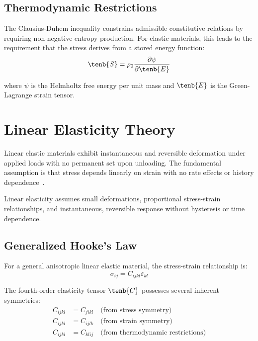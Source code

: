 \subsection{Thermodynamic Restrictions}

The Clausius-Duhem inequality constrains admissible constitutive relations by requiring non-negative entropy production. For elastic materials, this leads to the requirement that the stress derives from a stored energy function:
\begin{equation}
\tenb{S} = \rho_0 \frac{\partial \psi}{\partial \tenb{E}}
\end{equation}

where $\psi$ is the Helmholtz free energy per unit mass and $\tenb{E}$ is the Green-Lagrange strain tensor.

\section{Linear Elasticity Theory}

Linear elastic materials exhibit instantaneous and reversible deformation under applied loads with no permanent set upon unloading. The fundamental assumption is that stress depends linearly on strain with no rate effects or history dependence~\autocite{Sadd.2019}.

\begin{keypoint}
Linear elasticity assumes small deformations, proportional stress-strain relationships, and instantaneous, reversible response without hysteresis or time dependence.
\end{keypoint}

\subsection{Generalized Hooke's Law}

For a general anisotropic linear elastic material, the stress-strain relationship is:
\begin{equation}
\sigma_{ij} = C_{ijkl} \varepsilon_{kl}
\end{equation}

The fourth-order elasticity tensor $\tenb{C}$ possesses several inherent symmetries:
\begin{align}
C_{ijkl} &= C_{jikl} \quad \text{(from stress symmetry)}\\
C_{ijkl} &= C_{ijlk} \quad \text{(from strain symmetry)}\\
C_{ijkl} &= C_{klij} \quad \text{(from thermodynamic restrictions)}
\end{align}

